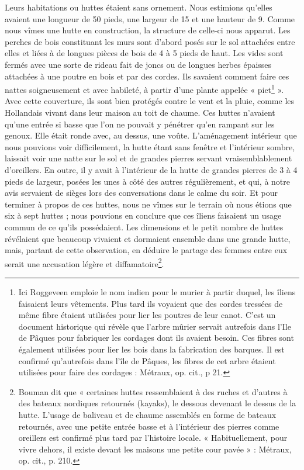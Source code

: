 \documentclass{article}
\begin{document}
        
    Leurs habitations ou huttes étaient sans ornement. Nous estimions qu'elles avaient une longueur de 50 pieds, une largeur de 15 et une hauteur de 9. Comme nous vîmes une hutte en construction, la structure de celle-ci nous apparut. Les perches de bois constituant les murs sont d'abord posés sur le sol attachées entre elles et liées à de longues pièces de bois de 4 à 5 pieds de haut. Les vides sont fermés avec une sorte de rideau fait de joncs ou de longues herbes épaisses attachées à une poutre en bois et par des cordes. Ils savaient comment faire ces nattes soigneusement et avec habileté, à partir d'une plante appelée « piet\footnote{Ici Roggeveen emploie le nom indien pour le murier à partir duquel, les îliens faisaient leurs vêtements. Plus tard ils voyaient que des cordes tressées de même fibre étaient utilisées pour lier les poutres de leur canot. C'est un document historique qui révèle que l'arbre mûrier servait autrefois dans l'Ile de Pâques pour fabriquer les cordages dont ils avaient besoin. Ces fibres sont également utilisées pour lier les bois dans la fabrication des barques. Il est confirmé qu'autrefois dans l'île de Pâques, les fibres de cet arbre étaient utilisées pour faire des cordages : Métraux, op. cit., p 21.} ». Avec cette couverture, ils sont bien protégés contre le vent et la pluie, comme les Hollandais vivant dans leur maison au toit de chaume. Ces huttes n'avaient qu'une entrée si basse que l'on ne pouvait y pénétrer qu'en rampant sur les genoux. Elle était ronde avec, au dessus, une voûte. L'aménagement intérieur que nous pouvions voir difficilement, la hutte étant sans fenêtre et l'intérieur sombre, laissait voir une natte sur le sol et de grandes pierres servant vraisemblablement d'oreillers. En outre, il y avait à l'intérieur de la hutte de grandes pierres de 3 à 4 pieds de largeur, posées les unes à côté des autres régulièrement, et qui, à notre avis servaient de sièges lors des conversations dans le calme du soir. Et pour terminer à propos de ces huttes, nous ne vîmes sur le terrain où nous étions que six à sept huttes ; nous pouvions en conclure que ces îliens faisaient un usage commun de ce qu'ils possédaient. Les dimensions et le petit nombre de huttes révélaient que beaucoup vivaient et dormaient ensemble dans une grande hutte, mais, partant de cette observation, en déduire le partage des femmes entre eux serait une accusation légère et diffamatoire\footnote{Bouman dit que « certaines huttes ressemblaient à des ruches et d'autres à des bateaux nordiques retournés (kayaks), le dessous devenant le dessus de la hutte. L'usage de baliveau et de chaume assemblés en forme de bateaux retournés, avec une petite entrée basse et à l'intérieur des pierres comme oreillers est confirmé plus tard par l'histoire locale. « Habituellement, pour vivre dehors, il existe devant les maisons une petite cour pavée » : Métraux, op. cit., p. 210.}.
            
\end{document}

